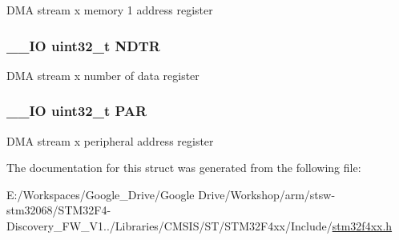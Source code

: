 D\-M\-A stream x memory 1 address register \hypertarget{struct_d_m_a___stream___type_def_af60258ad5a25addc1e8969665d0c1731}{
\subsubsection[{N\-D\-T\-R}]{\setlength{\rightskip}{0pt plus 5cm}\-\_\-\-\_\-\-I\-O uint32\-\_\-t N\-D\-T\-R}}\label{struct_d_m_a___stream___type_def_af60258ad5a25addc1e8969665d0c1731}
D\-M\-A stream x number of data register \hypertarget{struct_d_m_a___stream___type_def_aef55be3d948c22dd32a97e8d4f8761fd}{
\subsubsection[{P\-A\-R}]{\setlength{\rightskip}{0pt plus 5cm}\-\_\-\-\_\-\-I\-O uint32\-\_\-t P\-A\-R}}\label{struct_d_m_a___stream___type_def_aef55be3d948c22dd32a97e8d4f8761fd}
D\-M\-A stream x peripheral address register 

The documentation for this struct was generated from the following file\-:\begin{DoxyCompactItemize}
\item 
E\-:/\-Workspaces/\-Google\-\_\-\-Drive/\-Google Drive/\-Workshop/arm/stsw-\/stm32068/\-S\-T\-M32\-F4-\/\-Discovery\-\_\-\-F\-W\-\_\-\-V1../\-Libraries/\-C\-M\-S\-I\-S/\-S\-T/\-S\-T\-M32\-F4xx/\-Include/\hyperlink{stm32f4xx_8h}{stm32f4xx.\-h}\end{DoxyCompactItemize}
